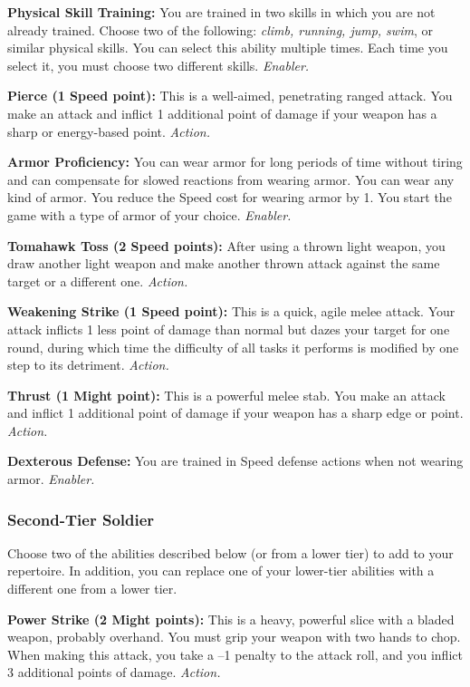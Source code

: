 \documentclass[a4paper,10pt,final,twocolumn,oneside]{book}
\newcommand{\itemAbility}[2]{\textcolor{25gray}{\textbullet\textbf{ #1:}}{ #2}\par}
\newcommand{\enabler}{\textit{ Enabler.}}
\newcommand{\action}{\textit{ Action.}}
\begin{document}
\itemAbility{Physical Skill Training}{You are trained in two skills in which you are not already trained. Choose two of the following: \textit{climb, running, jump, swim}, or similar physical skills. You can select this ability multiple times. Each time you select it, you must choose two different skills.\enabler}

\itemAbility{Pierce (1 Speed point)}{This is a well-aimed, penetrating ranged attack. You make an attack and inflict 1 additional point of damage if your weapon has a sharp or energy-based point.\action}

\itemAbility{Armor Proficiency}{You can wear armor for long periods of time without tiring and can compensate for slowed reactions from wearing armor. You can wear any kind of armor. You reduce the Speed cost for wearing armor by 1. You start the game with a type of armor of your choice.\enabler}

\itemAbility{Tomahawk Toss (2 Speed points)}{After using a thrown light weapon, you draw another light weapon and make another thrown attack against the same target or a different one.\action}

\itemAbility{Weakening Strike (1 Speed point)}{This is a quick, agile melee attack. Your attack inflicts 1 less point of damage than normal but dazes your target for one round, during which time the difficulty of all tasks it performs is modified by one step to its detriment.\action}

\itemAbility{Thrust (1 Might point)}{This is a powerful melee stab. You make an attack and inflict 1 additional point of damage if your weapon has a sharp edge or point.\action}

\itemAbility{Dexterous Defense}{You are trained in Speed defense actions when not wearing armor.\enabler}


\subsubsection*{Second-Tier Soldier}
\label{subsub:soldierSecondTier}

Choose two of the abilities described below (or from a lower tier) to add to your repertoire. In addition, you can replace one of your lower-tier abilities with a different one from a lower tier.

\itemAbility{Power Strike (2 Might points)}{This is a heavy, powerful slice with a bladed weapon, probably overhand. You must grip your weapon with two hands to chop. When making this attack, you take a –1 penalty to the attack roll, and you inflict 3 additional points of damage.\action}
\end{document}
